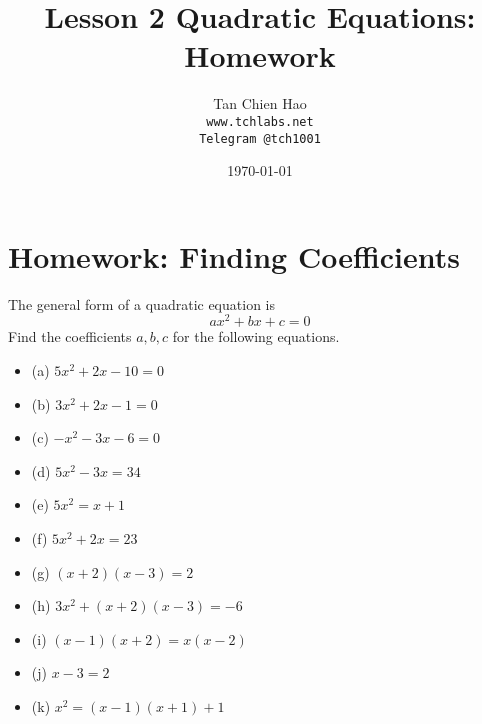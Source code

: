 \documentclass{article}
\title{Lesson 2 Quadratic Equations: Homework}
\author{
    Tan Chien Hao\\
    \texttt{www.tchlabs.net}\\
    \texttt{Telegram @tch1001}
}
\date{\today}
\begin{document}
\newif\ifpaper

\paperfalse 

\maketitle
\section{Homework: Finding Coefficients}
The general form of a quadratic equation is $$ax^2 + bx + c = 0$$ Find the coefficients $a,b,c$ for the following equations.
\begin{itemize}
    \item[](a) $5x^2 + 2x - 10 = 0$\\[40pt]
    \item[](b) $3x^2 + 2x - 1 = 0$\\[40pt]
    \item[](c) $-x^2 - 3x - 6 = 0$\\[40pt]
    \item[](d) $5x^2 - 3x = 34$\\[40pt]
    \item[](e) $5x^2 = x + 1$\\[40pt]
    \item[](f) $5x^2 + 2x = 23$\\[40pt]
    \item[](g) $(x+2)(x-3)=2$\\[40pt]
    \item[](h) $3x^2 + (x+2)(x-3) = -6$\\[40pt]
    \item[](i) $(x-1)(x+2)=x(x-2)$\\[40pt]
    \item[](j) $x-3=2$\\[40pt]
    \item[](k) $x^2 = (x-1)(x+1) + 1$\\[40pt]
\end{itemize}
\end{document}
